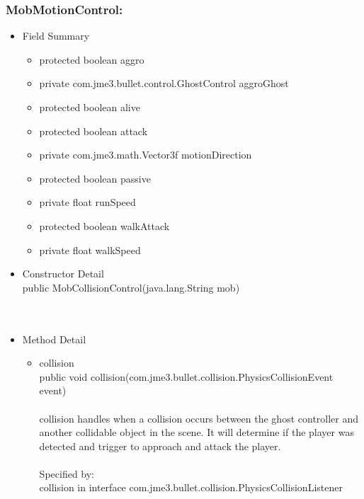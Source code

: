 \documentclass[letterpaper]{article}
\begin{document}
				\subsubsection*{MobMotionControl:}
				\vspace{0.1in}	
					\begin{itemize}
						\item	Field Summary
								\begin{itemize}
									\item	protected boolean	aggro 
									\item	private com.jme3.bullet.control.GhostControl	aggroGhost 
									\item	protected boolean	alive 
									\item	protected boolean	attack 
									\item	private com.jme3.math.Vector3f	motionDirection 
									\item	protected boolean	passive 
									\item	private float	runSpeed 
									\item	protected boolean	walkAttack 
									\item	private float	walkSpeed 
								\end{itemize}
						\item	Constructor Detail \\
								public MobCollisionControl(java.lang.String mob) \\ \\ \\
						\item	Method Detail
								\begin{itemize}
									\item	collision \\
											public void collision(com.jme3.bullet.collision.PhysicsCollisionEvent event) \\ \\
											collision handles when a collision occurs between the ghost controller and another collidable object in the scene. It will determine if the player was detected and trigger to approach and attack the player. \\ \\
											Specified by: \\
											collision in interface com.jme3.bullet.collision.PhysicsCollisionListener \\ \\

\end{itemize}
\end{itemize}
\end{document}
